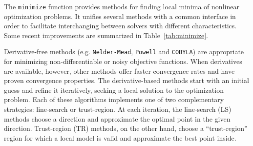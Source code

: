 The \texttt{minimize} function provides methods for finding local minima of
nonlinear optimization problems. It unifies several methods with a common 
interface in order to facilitate interchanging between solvers with different
characteristics. Some recent improvements are summarized in Table~\ref{tab:minimize}.

Derivative-free methods (e.g. \texttt{Nelder-Mead}, \texttt{Powell} and \texttt{COBYLA}) are appropriate for minimizing non-differentiable or
noisy objective functions. When derivatives are available, however, other methods offer faster convergence rates
and have proven convergence properties. 
The derivative-based methods start with an initial guess and refine it iteratively, seeking
a local solution to the optimization problem. Each of these algorithms implements one of two complementary strategies:
line-search or trust-region. At each iteration, the line-search (LS) methods choose a direction
and approximate the optimal point in the given direction. Trust-region (TR) methods, on the other
hand, choose a ``trust-region'' region for which a local model is valid and approximate the best point
inside.

